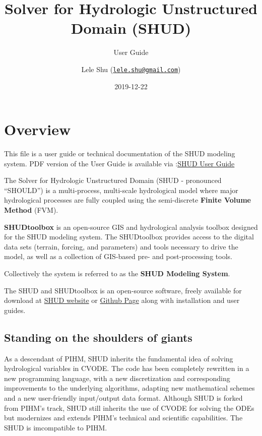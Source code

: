 \documentclass[]{scrbook}
\title{Solver for Hydrologic Unstructured Domain (SHUD)}
\subtitle{User Guide}
\author{Lele Shu
(\href{mailto:lele.shu@gmail.com}{\nolinkurl{lele.shu@gmail.com}})}
\date{2019-12-22}
\begin{document}
\maketitle

{
\setcounter{tocdepth}{2}
\tableofcontents
}
\chapter{Overview}\label{Overview}

This file is a user guide or technical documentation of the SHUD
modeling system. PDF version of the User Guide is available via
:\href{https://www.shud.xyz/_book/SHUD_User_Guide.pdf}{SHUD User Guide}

The Solver for Hydrologic Unstructured Domain (SHUD - pronounced
``SHOULD'') is a multi-process, multi-scale hydrological model where
major hydrological processes are fully coupled using the semi-discrete
\textbf{Finite Volume Method} (FVM).

\textbf{SHUDtoolbox} is an open-source GIS and hydrological analysis
toolbox designed for the SHUD modeling system. The SHUDtoolbox provides
access to the digital data sets (terrain, forcing, and parameters) and
tools necessary to drive the model, as well as a collection of GIS-based
pre- and post-processing tools.

Collectively the system is referred to as the \textbf{SHUD Modeling
System}.

The SHUD and SHUDtoolbox is an open-source software, freely available
for download at \href{https://SHUD-system.github.io}{SHUD website} or
\href{https://github.com/SHUD-System/}{Github Page} along with
installation and user guides.

\section{Standing on the shoulders of
giants}\label{standing-on-the-shoulders-of-giants}

As a descendant of PIHM, SHUD inherits the fundamental idea of solving
hydrological variables in CVODE. The code has been completely rewritten
in a new programming language, with a new discretization and
corresponding improvements to the underlying algorithms, adapting new
mathematical schemes and a new user-friendly input/output data format.
Although SHUD is forked from PIHM's track, SHUD still inherits the use
of CVODE for solving the ODEs but modernizes and extends PIHM's
technical and scientific capabilities. The SHUD is imcompatible to PIHM.
\end{document}
